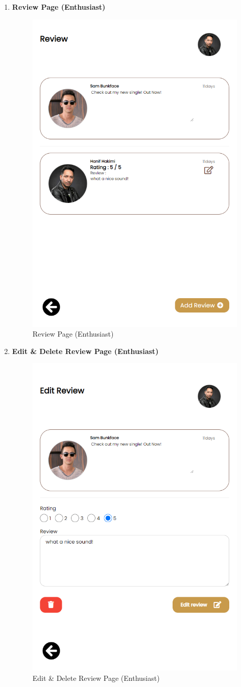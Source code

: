 \begin{enumerate}[1.]
    \item \textbf{Review Page (Enthusiast)}
    \begin{figure}[h]
        \centering
        \includegraphics[width=0.5\linewidth]{mainmatter/images/frontend/ss/Review (Enthusiast).png}
        \caption{Review Page (Enthusiast)}
        \label{fig:myfig65}
    \end{figure}

    \item \textbf{Edit \& Delete Review Page (Enthusiast)}
    \begin{figure}[h]
        \centering
        \includegraphics[width=0.5\linewidth]{mainmatter/images/frontend/ss/Edit-Delete Review (Enthusiast).png}
        \caption{Edit \& Delete Review Page (Enthusiast)}
        \label{fig:myfig66}
    \end{figure}


\end{enumerate}

